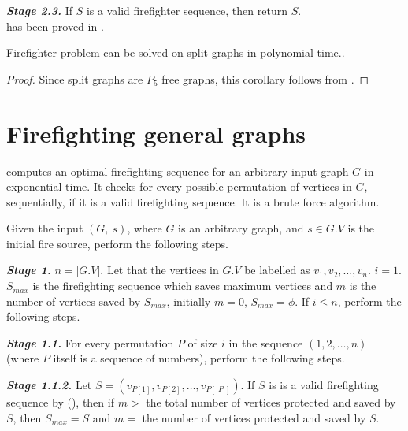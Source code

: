 \textbf{\textit{Stage 2.3.}} If $S$ is a valid firefighter sequence, then return $S$.\\

 has been proved in \cite{Fomin2016}.

\begin{corollary}\label{corollary:firefight-split-graphs}
    Firefighter problem can be solved on split graphs in polynomial time.\cite{Fomin2016}.
\end{corollary}

\begin{proof}
    Since split graphs are $P_5$ free graphs, this corollary follows from .
\end{proof}

\section{Firefighting general graphs}

 computes an optimal firefighting sequence for an arbitrary input graph $G$ in exponential time. It checks for every possible permutation of vertices in $G$, sequentially, if it is a valid firefighting sequence. It is a brute force algorithm.\\

\begin{algorithm}\label{algorithm:firefight-general-graphs}
Given the input $(G,\ s)$, where $G$ is an arbitrary graph, and $s\in G.V$ is the initial fire source, perform the following steps.
\end{algorithm}

\textbf{\textit{Stage 1.}} $n = |G.V|$. Let that the vertices in $G.V$ be labelled as $v_1,v_2,\dots,v_n$. $i=1$. $S_{max}$ is the firefighting sequence which saves maximum vertices and $m$ is the number of vertices saved by $S_{max}$, initially $m=0$, $S_{max}=\phi$. If $i\leq n$, perform the following steps.

\textbf{\textit{Stage 1.1.}} For every permutation $P$ of size $i$ in the sequence $(1,2,\dots,n)$ (where $P$ itself is a sequence of numbers), perform the following steps.

\textbf{\textit{Stage 1.1.2.}} Let $S = (v_{P[1]},v_{P[2]},\dots,v_{P[|P|]})$. If $S$ is is a valid firefighting sequence by  (), then if $m>$ the total number of vertices protected and saved by $S$, then $S_{max}=S$ and $m=$ the number of vertices protected and saved by $S$.

